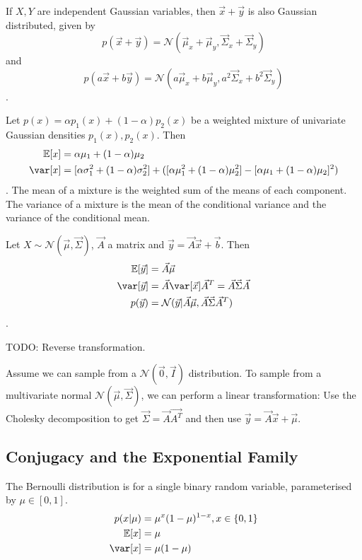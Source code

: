 If $X, Y$ are independent Gaussian variables, then $\vec{x} + \vec{y}$
is also Gaussian distributed, given by
\begin{equation*}
    p(\vec{x} + \vec{y})
    = \mathcal{N}(\vec{\mu}_x + \vec{\mu}_y, \vec{\Sigma}_x + \vec{\Sigma}_y)
\end{equation*}
and
\begin{equation*}
    p(a\vec{x} + b\vec{y})
    = \mathcal{N}(a\vec{\mu}_x + b\vec{\mu}_y, a^2\vec{\Sigma}_x + b^2\vec{\Sigma}_y)
\end{equation*}.

Let $p(x) = \alpha p_1(x) + (1 - \alpha)p_2(x)$ be a weighted
mixture of univariate Gaussian densities $p_1(x), p_2(x)$.
Then
\begin{align*}
    \mathbb{E}[x] &= \alpha \mu_1 + (1 - \alpha) \mu_2 \\
    \var[x] &= [\alpha \sigma_1^2 + (1 - \alpha) \sigma_2^2] +
    ([\alpha \mu_1^2 + (1 - \alpha) \mu_2^2] - [\alpha \mu_1 + (1 - \alpha) \mu_2]^2)
\end{align*}.
The mean of a mixture is the weighted sum of the means of each component.
The variance of a mixture is the mean of the conditional variance and
the variance of the conditional mean.

Let $X \sim \mathcal{N}(\vec{\mu}, \vec{\Sigma})$, $\vec{A}$ a matrix
and $\vec{y} = \vec{A}\vec{x} + \vec{b}$.
Then
\begin{align*}
    \mathbb{E}[\vec{y}] &= \vec{A} \vec{\mu} \\
    \var[\vec{y}] &= \vec{A} \var[\vec{x}] \vec{A}^T = \vec{A} \vec{\Sigma} \vec{A} \\
    p(\vec{y}) &= \mathcal{N}(\vec{y} | \vec{A}\vec{\mu}, \vec{A} \vec{\Sigma} \vec{A}^T)
\end{align*}.

TODO: Reverse transformation.

Assume we can sample from a $\mathcal{N}(\vec{0}, \vec{I})$ distribution.
To sample from a multivariate normal $\mathcal{N}(\vec{\mu}, \vec{\Sigma})$,
we can perform a linear transformation:
Use the Cholesky decomposition to get $\vec{\Sigma} = \vec{A}\vec{A^T}$
and then use $\vec{y} = \vec{A}\vec{x} + \vec{\mu}$.


\subsection{Conjugacy and the Exponential Family}
The Bernoulli distribution is for a single binary random variable,
parameterised by $\mu \in [0, 1]$.
\begin{align*}
    p(x | \mu) &= \mu^x (1 - \mu)^{1 - x}, x \in \{0, 1\} \\
    \mathbb{E}[x] &= \mu \\
    \var[x] &= \mu (1 - \mu)
\end{align*}

